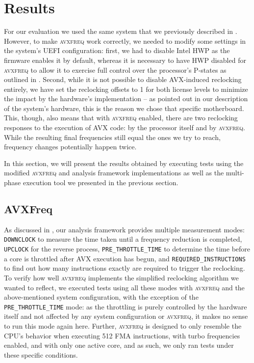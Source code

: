 \section{Results}
\label{sec:evaluation:results}

For our evaluation we used the same system that we previously described in . However, to make \textsc{avxfreq} work correctly, we needed to modify some settings in the system's \gls{UEFI} configuration: first, we had to disable Intel \gls{HWP} as the firmware enables it by default, whereas it is necessary to have \gls{HWP} disabled for \textsc{avxfreq} to allow it to exercise full control over the processor's \glspl{P-state} as outlined in . Second, while it is not possible to disable \gls{AVX}-induced reclocking entirely, we have set the reclocking offsets to 1 for both license levels to minimize the impact by the hardware's implementation -- as pointed out in our description of the system's hardware, this is the reason we chose that specific motherboard. This, though, also means that with \textsc{avxfreq} enabled, there are two reclocking responses to the execution of \gls{AVX} code: by the processor itself and by \textsc{avxfreq}. While the resulting final frequencies still equal the ones we try to reach, frequency changes potentially happen twice.

In this section, we will present the results obtained by executing tests using the modified \textsc{avxfreq} and analysis framework implementations as well as the multi-phase execution tool we presented in the previous section.

\subsection{AVXFreq}
\label{sec:evaluation:results:avxfreq}

As discussed in , our analysis framework provides multiple measurement modes: \texttt{DOWNCLOCK} to measure the time taken until a frequency reduction is completed, \texttt{UPCLOCK} for the reverse process, \texttt{PRE\_THROTTLE\_TIME} to determine the time before a core is throttled after \gls{AVX} execution has begun, and \texttt{REQUIRED\_INSTRUCTIONS} to find out how many instructions exactly are required to trigger the reclocking. To verify how well \textsc{avxfreq} implements the simplified reclocking algorithm we wanted to reflect, we executed tests using all these modes with \textsc{avxfreq} and the above-mentioned system configuration, with the exception of the \texttt{PRE\_THROTTLE\_TIME} mode: as the throttling is purely controlled by the hardware itself and not affected by any system configuration or \textsc{avxfreq}, it makes no sense to run this mode again here. Further, \textsc{avxfreq} is designed to only resemble the \gls{CPU}'s behavior when executing \SI{512}{\bit} \gls{FMA} instructions, with turbo frequencies enabled, and with only one active core, and as such, we only ran tests under these specific conditions.

